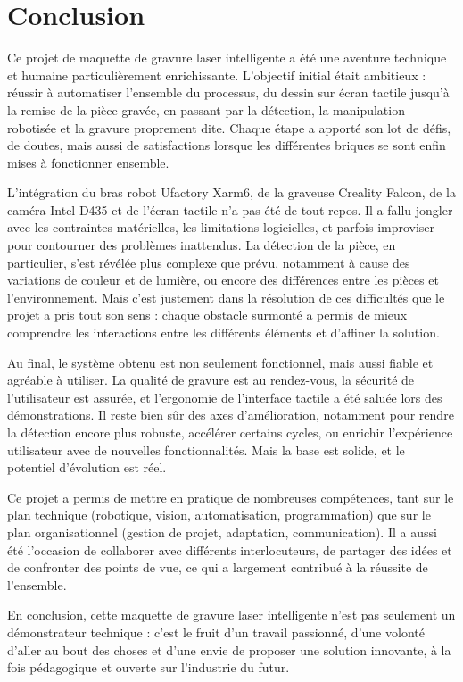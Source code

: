 \chapter{Conclusion}

Ce projet de maquette de gravure laser intelligente a été une aventure technique et humaine particulièrement enrichissante. L'objectif initial était ambitieux : réussir à automatiser l'ensemble du processus, du dessin sur écran tactile jusqu'à la remise de la pièce gravée, en passant par la détection, la manipulation robotisée et la gravure proprement dite. Chaque étape a apporté son lot de défis, de doutes, mais aussi de satisfactions lorsque les différentes briques se sont enfin mises à fonctionner ensemble.

L'intégration du bras robot Ufactory Xarm6, de la graveuse Creality Falcon, de la caméra Intel D435 et de l'écran tactile n'a pas été de tout repos. Il a fallu jongler avec les contraintes matérielles, les limitations logicielles, et parfois improviser pour contourner des problèmes inattendus. La détection de la pièce, en particulier, s'est révélée plus complexe que prévu, notamment à cause des variations de couleur et de lumière, ou encore des différences entre les pièces et l'environnement. Mais c'est justement dans la résolution de ces difficultés que le projet a pris tout son sens : chaque obstacle surmonté a permis de mieux comprendre les interactions entre les différents éléments et d'affiner la solution.

Au final, le système obtenu est non seulement fonctionnel, mais aussi fiable et agréable à utiliser. La qualité de gravure est au rendez-vous, la sécurité de l'utilisateur est assurée, et l'ergonomie de l'interface tactile a été saluée lors des démonstrations. Il reste bien sûr des axes d'amélioration, notamment pour rendre la détection encore plus robuste, accélérer certains cycles, ou enrichir l'expérience utilisateur avec de nouvelles fonctionnalités. Mais la base est solide, et le potentiel d'évolution est réel.

Ce projet a permis de mettre en pratique de nombreuses compétences, tant sur le plan technique (robotique, vision, automatisation, programmation) que sur le plan organisationnel (gestion de projet, adaptation, communication). Il a aussi été l'occasion de collaborer avec différents interlocuteurs, de partager des idées et de confronter des points de vue, ce qui a largement contribué à la réussite de l'ensemble.

En conclusion, cette maquette de gravure laser intelligente n'est pas seulement un démonstrateur technique : c'est le fruit d'un travail passionné, d'une volonté d'aller au bout des choses et d'une envie de proposer une solution innovante, à la fois pédagogique et ouverte sur l'industrie du futur.

\vfil
\hspace{8cm}\makeatletter\@author\makeatother\par
\hspace{8cm}\begin{minipage}{5cm}
    \printsignature
\end{minipage}